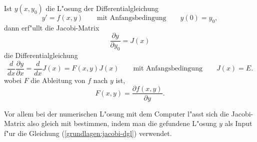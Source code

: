 \begin{satz}
Ist $y(x,y_0)$ die L"osung der Differentialgleichung 
\[
y'=f(x,y)\qquad\text{mit Anfangsbedingung}\qquad y(0)=y_0,
\]
dann erf"ullt die Jacobi-Matrix 
\[
\frac{\partial y}{\partial y_0}=J(x)
\]
die Differentialgleichung
\begin{equation}
\frac{d}{dx}\frac{\partial y}{\partial x}
=
\frac{d}{dx}J(x)
=
F(x,y)J(x)
\qquad
\text{mit Anfangsbedingung}
\qquad
J(x)=E.
\label{grundlagen:jacobi-dgl}
\end{equation}
wobei $F$ die Ableitung von $f$ nach $y$ ist,
\[
F(x,y)=\frac{\partial f(x,y)}{\partial y}.
\]
\end{satz}
Vor allem bei der numerischen L"osung mit dem Computer l"asst sich
die Jacobi-Matrix also gleich mit bestimmen, indem man die gefundene
L"osung $y$ als Input f"ur die Gleichung (\ref{grundlagen:jacobi-dgl})
verwendet.

